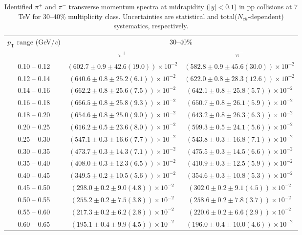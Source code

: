\begin{table}
\caption{Identified $\pi^{+}$ and $\pi^{-}$  transverse momentum spectra at midrapidity ($|y|<0.1$) in pp collisions at 7 TeV for 30--40\% multiplicity class. Uncertainties are statistical and total($N_{ch}$-dependent) systematics, respectively.}
\label{tab:PionPlus_PionMinus_30to40}
\begin{center}
\begin{tabular}{ c | c c }
\hline
\multirow{2}{*}{$p_{\mathrm{T}}$ range (GeV/\textit{c})} & \multicolumn{2}{c}{30--40\%} \\ & $\pi^{+}$& $\pi^{-}$\\ 
\hline
0.10 -- 0.12 & $(602.7\pm0.9\pm42.6(19.0))\times10^{-2}$ & $(582.8\pm0.9\pm45.6(30.0))\times10^{-2}$ \\ 
0.12 -- 0.14 & $(640.6\pm0.8\pm25.2(6.1))\times10^{-2}$ & $(622.0\pm0.8\pm28.3(12.6))\times10^{-2}$ \\ 
0.14 -- 0.16 & $(662.2\pm0.8\pm25.6(7.5))\times10^{-2}$ & $(642.1\pm0.8\pm25.8(5.7))\times10^{-2}$ \\ 
0.16 -- 0.18 & $(666.5\pm0.8\pm25.8(9.3))\times10^{-2}$ & $(650.7\pm0.8\pm26.1(5.9))\times10^{-2}$ \\ 
0.18 -- 0.20 & $(654.6\pm0.8\pm25.0(9.0))\times10^{-2}$ & $(643.2\pm0.8\pm26.3(6.3))\times10^{-2}$ \\ 
0.20 -- 0.25 & $(616.2\pm0.5\pm23.6(8.0))\times10^{-2}$ & $(599.3\pm0.5\pm24.1(5.6))\times10^{-2}$ \\ 
0.25 -- 0.30 & $(547.1\pm0.3\pm16.6(7.7))\times10^{-2}$ & $(543.8\pm0.3\pm16.8(7.1))\times10^{-2}$ \\ 
0.30 -- 0.35 & $(473.7\pm0.3\pm14.3(7.1))\times10^{-2}$ & $(475.5\pm0.3\pm14.5(6.6))\times10^{-2}$ \\ 
0.35 -- 0.40 & $(408.0\pm0.3\pm12.3(6.5))\times10^{-2}$ & $(410.9\pm0.3\pm12.5(5.9))\times10^{-2}$ \\ 
0.40 -- 0.45 & $(349.5\pm0.2\pm10.5(5.6))\times10^{-2}$ & $(354.6\pm0.3\pm10.8(5.3))\times10^{-2}$ \\ 
0.45 -- 0.50 & $(298.0\pm0.2\pm9.0(4.8))\times10^{-2}$ & $(302.0\pm0.2\pm9.1(4.5))\times10^{-2}$ \\ 
0.50 -- 0.55 & $(255.2\pm0.2\pm7.5(3.8))\times10^{-2}$ & $(258.6\pm0.2\pm7.8(3.7))\times10^{-2}$ \\ 
0.55 -- 0.60 & $(217.3\pm0.2\pm6.2(2.8))\times10^{-2}$ & $(220.6\pm0.2\pm6.6(2.9))\times10^{-2}$ \\ 
0.60 -- 0.65 & $(195.1\pm0.4\pm9.9(4.5))\times10^{-2}$ & $(196.0\pm0.4\pm10.0(4.6))\times10^{-2}$ \\ 

\end{tabular}
\end{center}
\end{table}

